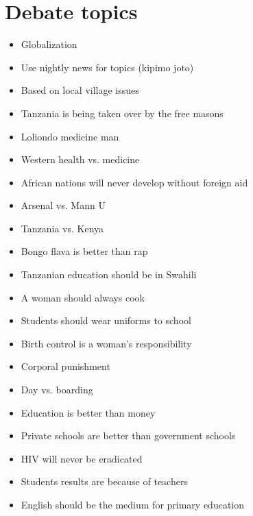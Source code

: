 \section{Debate topics}
\begin{itemize}
\item Globalization 
\item Use nightly news for topics (kipimo joto)  
\item Based on local village issues  
\item Tanzania is being taken over by the free masons  
\item Loliondo medicine man 
\item Western health vs. medicine  
\item African nations will never develop without foreign aid  
\item Arsenal vs. Mann U  
\item Tanzania vs. Kenya  
\item Bongo flava is better than rap  
\item Tanzanian education should be in Swahili  
\item A woman should always cook  
\item Students should wear uniforms to school  
\item Birth control is a woman's responsibility  
\item Corporal punishment  
\item Day vs. boarding  
\item Education is better than money  
\item Private schools are better than government schools  
\item HIV will never be eradicated  
\item Students results are because of teachers  
\item English should be the medium for primary education 
\end{itemize}

